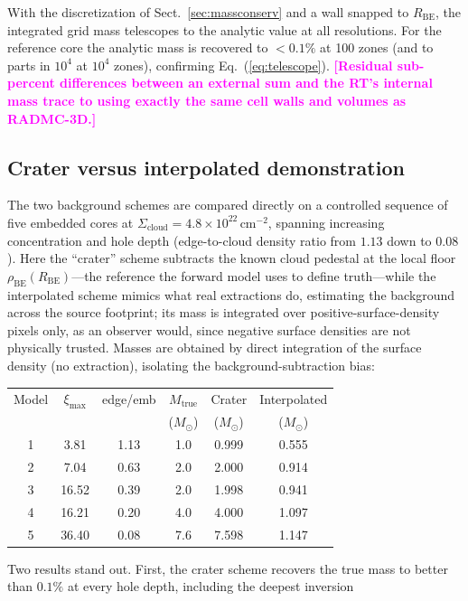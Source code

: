 \documentclass[11pt,a4paper]{article}
\newcommand{\note}[1]{\textcolor{magenta}{\textbf{[#1]}}}
\newcommand{\msun}{M_{\odot}}
\newcommand{\Rbe}{R_{\mathrm{BE}}}
\newcommand{\ximax}{\xi_{\mathrm{max}}}
\newcommand{\Scloud}{\Sigma_{\mathrm{cloud}}}
\begin{document}
With the discretization of Sect.~\ref{sec:massconserv} and a wall snapped to
$\Rbe$, the integrated grid mass telescopes to the analytic value at all
resolutions. For the reference core the analytic mass is recovered to
$<0.1\%$ at 100 zones (and to parts in $10^{4}$ at $10^{4}$ zones),
confirming Eq.~(\ref{eq:telescope}). \note{Residual sub-percent differences
between an external sum and the RT's internal mass trace to using exactly
the same cell walls and volumes as RADMC-3D.}

\subsection{Crater versus interpolated demonstration}
\label{sec:cratervsinterp}

The two background schemes are compared directly on a controlled sequence of
five embedded cores at $\Scloud=4.8\times10^{22}\,\mathrm{cm^{-2}}$, spanning
increasing concentration and hole depth (edge-to-cloud density ratio from
$1.13$ down to $0.08$). Here the ``crater'' scheme subtracts the known cloud
pedestal at the local floor $\rho_{\mathrm{BE}}(\Rbe)$---the reference the
forward model uses to define truth---while the interpolated scheme mimics what
real extractions do, estimating the background across the source footprint;
its mass is integrated over positive-surface-density pixels only, as an
observer would, since negative surface densities are not physically trusted.
Masses are obtained by direct integration of the surface density (no
extraction), isolating the background-subtraction bias:
\begin{center}
\begin{tabular}{cccccc}
\hline
Model & $\ximax$ & edge/emb & $M_{\mathrm{true}}$ & Crater & Interpolated\\
      &          &          & ($\msun$)           & ($\msun$) & ($\msun$)\\
\hline
1 &  3.81 & 1.13 & 1.0 & 0.999 & 0.555 \\
2 &  7.04 & 0.63 & 2.0 & 2.000 & 0.914 \\
3 & 16.52 & 0.39 & 2.0 & 1.998 & 0.941 \\
4 & 16.21 & 0.20 & 4.0 & 4.000 & 1.097 \\
5 & 36.40 & 0.08 & 7.6 & 7.598 & 1.147 \\
\hline
\end{tabular}
\end{center}
Two results stand out. First, the crater scheme recovers the true mass to
better than $0.1\%$ at every hole depth, including the deepest inversion
\end{document}
